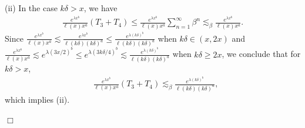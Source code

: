 \documentclass[11pt]{article}
\numberwithin{equation}{section}
\begin{document}
(ii) In the case $k\delta>x$, we have 
\begin{align}
	\frac{e^{\lambda x^b}}{\ell(x)x^a } (T_3+T_4)\leq \frac{e^{\lambda x^b}}{\ell(x)x^a } \sum_{n=1}^\infty   \beta^{n} \lesssim_\beta   \frac{e^{\lambda x^b}}{\ell(x)x^a }.
\end{align}
Since  $\frac{e^{\lambda x^b}}{\ell(x)x^a } \lesssim \frac{e^{\lambda x^b}}{\ell(k\delta)(k\delta)^a } \leq \frac{e^{\lambda (k\delta)^b}}{\ell(k\delta)(k\delta)^a } $ when $k\delta \in (x,2x)$ and  $\frac{e^{\lambda x^b}}{\ell(x)x^a }  \lesssim  e^{\lambda (3x/2)^b} \leq e^{\lambda (3 k\delta/4)^b} \lesssim  \frac{e^{\lambda (k\delta)^b}}{\ell(k\delta)(k\delta)^a } $ when $k\delta  \geq 2x$, we conclude that for $k\delta>x$,
\begin{align}\label{e26-3}
	& \frac{e^{\lambda x^b}}{\ell(x)x^a } (T_3+T_4) \lesssim_\beta  \frac{e^{ \lambda (k\delta)^b }}{\ell(k\delta)(k\delta)^a},
\end{align}
which implies (ii). 

\hfill$\Box$
\end{document}
